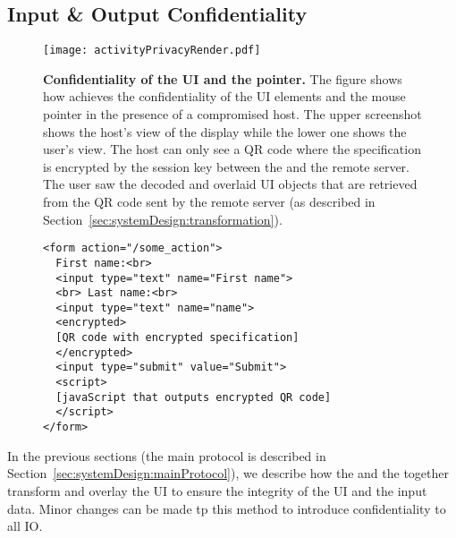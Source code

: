 \subsection{Input \& Output Confidentiality}
\label{sec:systemDesign:mousePrivacy}


\begin{figure}[t]
\centering
\texttt{[image: activityPrivacyRender.pdf]}
\caption{\textbf{Confidentiality of the UI and the pointer.} The figure shows how \name achieves the confidentiality of the UI elements and the mouse pointer in the presence of a compromised host. The upper screenshot shows the host's view of the display while the lower one shows the user's view. The host can only see a QR code where the specification is encrypted by the \tls session key between the \device and the remote server. The user saw the decoded and overlaid UI objects that are retrieved from the QR code sent by the remote server (as described in Section~\ref{sec:systemDesign:transformation}).}
\label{fig:activityPrivacy}
\centering
\end{figure}


\begin{figure}[t]
\small
\begin{lstlisting}[mathescape=true]
<form action="/some_action">
  First name:<br>
  <input type="text" name="First name">
  <br> Last name:<br>
  <input type="text" name="name">
  <encrypted>
  [QR code with encrypted specification]
  </encrypted>
  <input type="submit" value="Submit">
  <script>
  [javaScript that outputs encrypted QR code]
  </script>
</form> 
\end{lstlisting} 
\end{figure}

In the previous sections (the main protocol is described in Section~\ref{sec:systemDesign:mainProtocol}), we describe how the \name \js and the \device together transform and overlay the UI to ensure the integrity of the UI and the input data. Minor changes can be made tp this method to introduce confidentiality to all IO.

